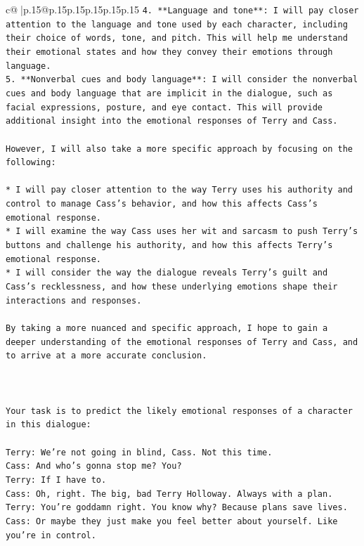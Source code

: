 \documentclass{article}
\begin{document}
{\begin{supertabular}{c@{$\;$}|p{.15\linewidth}@{}p{.15\linewidth}p{.15\linewidth}p{.15\linewidth}p{.15\linewidth}p{.15\linewidth}}
{{{\texttt{4. **Language and tone**: I will pay closer attention to the language and tone used by each character, including their choice of words, tone, and pitch. This will help me understand their emotional states and how they convey their emotions through language.} \\
\texttt{5. **Nonverbal cues and body language**: I will consider the nonverbal cues and body language that are implicit in the dialogue, such as facial expressions, posture, and eye contact. This will provide additional insight into the emotional responses of Terry and Cass.} \\
\\ 
\texttt{However, I will also take a more specific approach by focusing on the following:} \\
\\ 
\texttt{* I will pay closer attention to the way Terry uses his authority and control to manage Cass's behavior, and how this affects Cass's emotional response.} \\
\texttt{* I will examine the way Cass uses her wit and sarcasm to push Terry's buttons and challenge his authority, and how this affects Terry's emotional response.} \\
\texttt{* I will consider the way the dialogue reveals Terry's guilt and Cass's recklessness, and how these underlying emotions shape their interactions and responses.} \\
\\ 
\texttt{By taking a more nuanced and specific approach, I hope to gain a deeper understanding of the emotional responses of Terry and Cass, and to arrive at a more accurate conclusion.} \\
\\ 
\\ 
\\ 
\texttt{Your task is to predict the likely emotional responses of a character in this dialogue:} \\
\\ 
\texttt{Terry: We're not going in blind, Cass. Not this time.} \\
\texttt{Cass: And who's gonna stop me? You?} \\
\texttt{Terry: If I have to. } \\
\texttt{Cass: Oh, right. The big, bad Terry Holloway. Always with a plan. } \\
\texttt{Terry: You're goddamn right. You know why? Because plans save lives.} \\
\texttt{Cass: Or maybe they just make you feel better about yourself. Like you're in control.} \\
}}}
\end{supertabular}}
\end{document}
